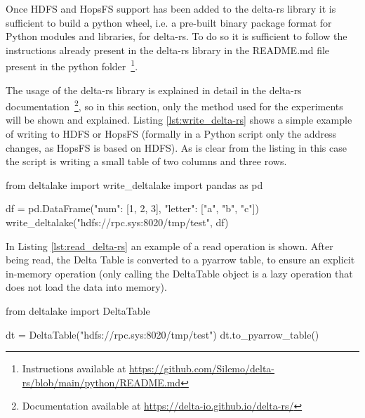 Once \gls{HDFS} and \gls{HopsFS} support has been added to the delta-rs library it is sufficient to build a python wheel, i.e. a pre-built binary package format for Python modules and libraries, for delta-rs. To do so it is sufficient to follow the instructions already present in the delta-rs library in the README.md file present in the python folder~\footnote{Instructions available at \url{https://github.com/Silemo/delta-rs/blob/main/python/README.md}}.

The usage of the delta-rs library is explained in detail in the delta-rs documentation~\footnote{Documentation available at \url{https://delta-io.github.io/delta-rs/}}, so in this section, only the method used for the experiments will be shown and explained. Listing \ref{lst:write_delta-rs} shows a simple example of writing to \gls{HDFS} or \gls{HopsFS} (formally in a Python script only the address changes, as \gls{HopsFS} is based on \gls{HDFS}). As is clear from the listing in this case the script is writing a small table of two columns and three rows.

\begin{python}[caption={[Writing with delta-rs]Writing a data frame on a Delta Table with delta-rs on \gls{HDFS} or \gls{HopsFS}.}, label={lst:write_delta-rs}]
from deltalake import write_deltalake
import pandas as pd

df = pd.DataFrame({"num": [1, 2, 3], 
                   "letter": ["a", "b", "c"]})
write_deltalake("hdfs://rpc.sys:8020/tmp/test", df)
\end{python}
\medskip

In Listing \ref{lst:read_delta-rs} an example of a read operation is shown. After being read, the Delta Table is converted to a pyarrow table, to ensure an explicit in-memory operation (only calling the DeltaTable object is a lazy operation that does not load the data into memory).

\begin{python}[caption={[Reading with delta-rs]Reading a data frame on a Delta Table with delta-rs on \gls{HDFS} or \gls{HopsFS}. Note: without the last line, the Delta Table is not loaded into memory, as delta-rs has a lazy evaluation approach.}, label={lst:read_delta-rs}]
from deltalake import DeltaTable

dt = DeltaTable("hdfs://rpc.sys:8020/tmp/test")
dt.to_pyarrow_table()
\end{python}
